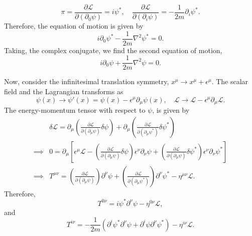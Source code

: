 \begin{solution}
    \begin{equation}
        \pi = \frac{\partial\mathcal{L}}{\partial(\partial_0\psi)} = i\psi^*,\quad\frac{\partial\mathcal{L}}{\partial(\partial_i\psi)} =-\frac{1}{2m}\partial_i\psi^*.
    \end{equation}
    Therefore, the equation of motion is given by
    \begin{equation}
        i\partial_0\psi^* - \frac{1}{2m}\nabla^2\psi^* = 0.
    \end{equation}
    Taking, the complex conjugate, we find the second equation of motion,
    \begin{equation}
        i\partial_0\psi + \frac{1}{2m}\nabla^2\psi = 0.
    \end{equation}

    Now, consider the infinitesimal translation symmetry, $x^\mu \to x^\mu + \epsilon^\mu$. The scalar field and the Lagrangian transforms as
    \begin{equation}
        \psi(x) \to \psi'(x) = \psi(x) -\epsilon^\mu \partial_\mu\psi(x),\quad\mathcal{L} \to \mathcal{L}-\epsilon^\mu\partial_\mu\mathcal{L}.
    \end{equation}
    The energy-momentum tensor with respect to $\psi$, is given by
    \begin{align}
        &\delta\mathcal{L} = \partial_\mu\left(\frac{\partial\mathcal{L}}{\partial(\partial_\mu\psi)}\delta\psi\right) + \partial_\mu\left(\frac{\partial\mathcal{L}}{\partial(\partial_\mu\psi^*)}\delta\psi^*\right) \\\implies& 0 =\partial_\mu\left[\epsilon^\mu\mathcal{L} - \left(\frac{\partial\mathcal{L}}{\partial(\partial_\mu\psi)}\delta\psi\right)\epsilon^\nu\partial_\nu\psi+\left(\frac{\partial\mathcal{L}}{\partial(\partial_\mu\psi)}\delta\psi^*\right)\epsilon^\nu\partial_\nu\psi^*\right]\\
        \implies& T^{\mu\nu} = \left(\frac{\partial\mathcal{L}}{\partial(\partial_\mu\psi)}\right)\partial^\nu\psi + \left(\frac{\partial\mathcal{L}}{\partial(\partial_\mu\psi^*)}\right)\partial^\nu\psi^*-\eta^{\mu\nu}\mathcal{L}.
    \end{align}
    Therefore,
    \begin{equation}
        T^{0\nu}  = i\psi^*\partial^\nu\psi -\eta^{0\nu}\mathcal{L},
    \end{equation}
    and
    \begin{equation}
        T^{i\nu} = -\frac{1}{2m}(\partial^i\psi^*\partial^\nu\psi + \partial^i\psi\partial^\nu\psi^* ) -\eta^{i\nu}\mathcal{L}.

\end{equation}
\end{solution}
